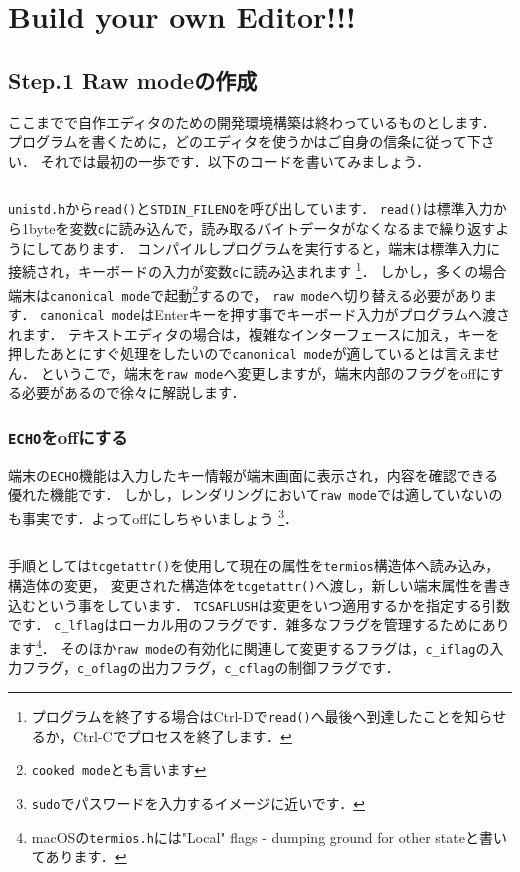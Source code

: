 \section{Build your own Editor!!!}
\subsection{Step.1 Raw modeの作成}
ここまでで自作エディタのための開発環境構築は終わっているものとします．
プログラムを書くために，どのエディタを使うかはご自身の信条に従って下さい．
それでは最初の一歩です．以下のコードを書いてみましょう．
\inputminted[frame=lines,framesep=2mm,baselinestretch=1.2,fontsize=\footnotesize,linenos,breaklines]{c}{\takuzooasset/step1_1.c}
\texttt{unistd.h}から\texttt{read()}と\texttt{STDIN_FILENO}を呼び出しています．
\texttt{read()}は標準入力から1byteを変数\texttt{c}に読み込んで，読み取るバイトデータがなくなるまで繰り返すようにしてあります．
コンパイルしプログラムを実行すると，端末は標準入力に接続され，キーボードの入力が変数\texttt{c}に読み込まれます
\footnote{プログラムを終了する場合はCtrl-Dで\texttt{read()}へ最後へ到達したことを知らせるか，Ctrl-Cでプロセスを終了します．}．
しかし，多くの場合端末は\texttt{canonical mode}で起動\footnote{\texttt{cooked mode}とも言います}するので，
\texttt{raw mode}へ切り替える必要があります．
\texttt{canonical mode}はEnterキーを押す事でキーボード入力がプログラムへ渡されます．
テキストエディタの場合は，複雑なインターフェースに加え，キーを押したあとにすぐ処理をしたいので\texttt{canonical mode}が適しているとは言えません．
というこで，端末を\texttt{raw mode}へ変更しますが，端末内部のフラグをoffにする必要があるので徐々に解説します．

\subsubsection{\texttt{ECHO}をoffにする}
端末の\texttt{ECHO}機能は入力したキー情報が端末画面に表示され，内容を確認できる優れた機能です．
しかし，レンダリングにおいて\texttt{raw mode}では適していないのも事実です．よってoffにしちゃいましょう
\footnote{\texttt{sudo}でパスワードを入力するイメージに近いです．}．
\inputminted[frame=lines,framesep=2mm,baselinestretch=1.2,fontsize=\footnotesize,linenos,breaklines]{c}{\takuzooasset/step1_2.c}
手順としては\texttt{tcgetattr()}を使用して現在の属性を\texttt{termios}構造体へ読み込み，構造体の変更，
変更された構造体を\texttt{tcgetattr()}へ渡し，新しい端末属性を書き込むという事をしています．
\texttt{TCSAFLUSH}は変更をいつ適用するかを指定する引数です．
\texttt{c_lflag}はローカル用のフラグです．雑多なフラグを管理するためにあります\footnote{macOSの\texttt{termios.h}には"Local" flags - dumping ground for other stateと書いてあります．}．
そのほか\texttt{raw mode}の有効化に関連して変更するフラグは，\texttt{c_iflag}の入力フラグ，\texttt{c_oflag}の出力フラグ，\texttt{c_cflag}の制御フラグです．

